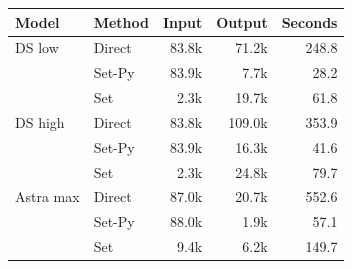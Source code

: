 \begin{tabular}{llrrr}
\toprule
Model & Method & Input & Output & Seconds \\
\midrule
DS low & Direct & 83.8k & 71.2k & 248.8 \\
 & Set-Py & 83.9k & 7.7k & 28.2 \\
 & Set & 2.3k & 19.7k & 61.8 \\
\midrule
DS high & Direct & 83.8k & 109.0k & 353.9 \\
 & Set-Py & 83.9k & 16.3k & 41.6 \\
 & Set & 2.3k & 24.8k & 79.7 \\
\midrule
Astra max & Direct & 87.0k & 20.7k & 552.6 \\
 & Set-Py & 88.0k & 1.9k & 57.1 \\
 & Set & 9.4k & 6.2k & 149.7 \\
\bottomrule
\end{tabular}
